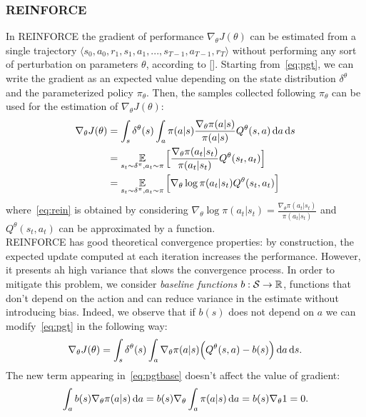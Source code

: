 \subsubsection{REINFORCE} \label{subsec:rein}
In REINFORCE the gradient of performance $\nabla_{\theta}J(\theta)$ can be estimated from a single trajectory $\langle s_0, a_0, r_1, s_1, a_1, ..., s_{T-1}, a_{T-1}, r_{T} \rangle$ without performing any sort of perturbation on parameters $\theta$, according to [\citet{Williams1992SimpleSG}]. Starting from~\eqref{eq:pgt}, we can write the gradient as an expected value depending on the state distribution $\delta^{\theta}$ and the parameterized policy $\pi_{\theta}$. Then, the samples collected following $\pi_{\theta}$ can be used for the estimation of $\nabla_{\theta}J(\theta)$: 
\begin{align}
\nabla_{\theta}J(\theta) &= \int_s \delta^{\theta}(s) \int_a \pi(a|s) \frac{\nabla_{\theta} \pi(a|s)}{\pi(a|s)} Q^{\theta}(s,a) \,\mathrm{d} a \,\mathrm{d} s \nonumber\\
&= \operatorname*{\mathbb{E}}_{s_t \sim \delta^{\pi}, a_t \sim \pi} \Big[ \frac{\nabla_{\theta} \pi(a_t|s_t)}{\pi(a_t|s_t)} Q^{\theta}(s_t,a_t) \Big] \nonumber\\
&= \operatorname*{\mathbb{E}}_{s_t \sim \delta^{\pi}, a_t \sim \pi} \Big[ \nabla_{\theta} \log\pi(a_t|s_t) Q^{\theta}(s_t,a_t) \Big] \label{eq:rein}
\end{align}
where~\eqref{eq:rein} is obtained by considering $\nabla_{\theta} \log\pi(a_t|s_t) = \frac{\nabla_{\theta} \pi(a_t|s_t)}{\pi(a_t|s_t)}$ and $Q^{\theta}(s_t, a_t)$ can be approximated by a function.\\
\newline
REINFORCE has good theoretical convergence properties: by construction, the expected update computed at each iteration increases the performance. However, it presents ah high variance that slows the convergence process. In order to mitigate this problem, we consider \emph{baseline functions} $b: \mathcal{S} \to \mathbb{R}$, \ie functions that don't depend on the action and can reduce variance in the estimate without introducing bias.
Indeed, we observe that if $b(s)$ does not depend on $a$ we can modify~\eqref{eq:pgt} in the following way:
\begin{align} \nabla_{\theta}J(\theta) = \int_s \delta^{\theta}(s) \int_a \nabla_{\theta} \pi(a|s) \Big( Q^{\theta}(s,a) -b(s) \Big) \,\mathrm{d} a \,\mathrm{d} s. \label{eq:pgtbase}\end{align}
The new term appearing in~\eqref{eq:pgtbase} doesn't affect the value of gradient:
\begin{align} \int_a b(s) \nabla_{\theta} \pi(a|s) \,\mathrm{d} a = b(s) \nabla_{\theta} \int_a \pi(a|s) \,\mathrm{d} a = b(s) \nabla_{\theta} 1 = 0. \end{align}
